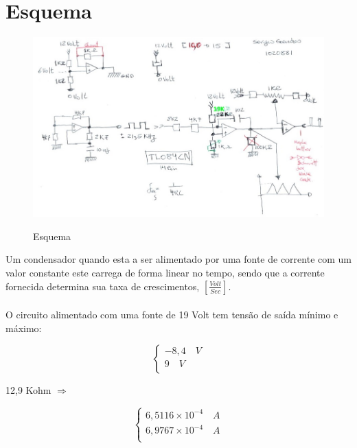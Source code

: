 \section{Esquema}
\begin{figure}[H]
	\centering
	\includegraphics[scale=0.6]{./image/esquema.jpg}\\
	\caption{Esquema}
\end{figure}
Um condensador quando esta a ser alimentado por uma fonte de corrente com um valor constante este carrega de forma linear no tempo, sendo que a corrente fornecida determina sua taxa de crescimentos, $\left[ \frac{Volt}{Sec} \right]$.\\ \\
O circuito alimentado com uma fonte de 19 Volt tem tensão de saída mínimo e máximo: \\
\begin{minipage}[l]{0pt}
	$$\left\lbrace\begin{array}{c}
 	-8,4 \quad V \\
 	9 \quad V \\
 \end{array}\right.$$
\end{minipage}
\hspace{3cm} 12,9 Kohm \qquad $\Longrightarrow$ \hspace{1cm}
\begin{minipage}[l]{0pt}
	$$\left\lbrace\begin{array}{c}
		6,5116 \times 10^{-4} \quad A \\
		6,9767 \times 10^{-4} \quad A \\
	\end{array}\right.$$
\end{minipage}\\
\\

